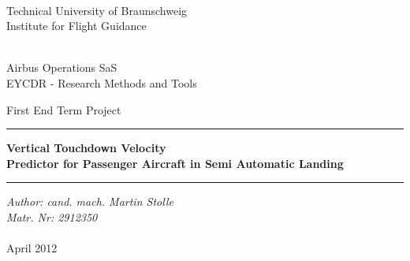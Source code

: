 \begin{titlepage}
\noindent
\parbox{0.47\textwidth}{\begin{flushleft} \\
Technical University of Braunschweig\\
Institute for Flight Guidance \end{flushleft}}
\hfill
\parbox{0.48\textwidth}{\\
Airbus Operations SaS\\
EYCDR - Research Methods and Tools}

\vspace{2.5 cm}

{\centering \textsc First End Term Project}
\vspace{0.3 cm}
\hrule
\vspace{0.2cm}
{\huge \bfseries \noindent Vertical Touchdown Velocity \\Predictor for Passenger Aircraft in Semi Automatic Landing}
\vspace{0.2 cm}
\hrule
\vspace{1.5 cm}
{\itshape \noindent Author: cand. mach. Martin Stolle \\Matr. Nr: 2912350}\\
\vspace{8 cm}\\
%
\noindent
\flushleft{\rule{1.0\textwidth}{0.1cm}}
April 2012
\end{titlepage}